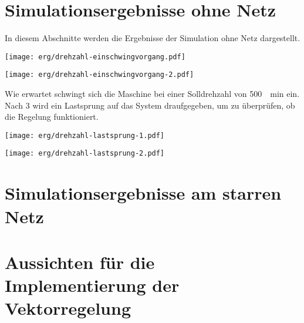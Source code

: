 \section{Simulationsergebnisse ohne Netz}\label{sec:sim-ohne-netz}

In diesem Abschnitte werden die Ergebnisse der Simulation ohne Netz dargestellt.

\begin{minipage}[t]{0.5\textwidth}
		\texttt{[image: erg/drehzahl-einschwingvorgang.pdf]}
\end{minipage}
\begin{minipage}[t]{0.5\textwidth}
		\texttt{[image: erg/drehzahl-einschwingvorgang-2.pdf]}
\end{minipage}

Wie erwartet schwingt sich die Maschine bei einer Solldrehzahl von \SI{500}{\per\minute} ein.
Nach \SI{3}{\sec} wird ein Lastsprung auf das System draufgegeben, um zu überprüfen, ob die Regelung funktioniert.

\begin{minipage}[t]{0.5\textwidth}
	\texttt{[image: erg/drehzahl-lastsprung-1.pdf]}
\end{minipage}
\begin{minipage}[t]{0.5\textwidth}
	\texttt{[image: erg/drehzahl-lastsprung-2.pdf]}
\end{minipage}

\section{Simulationsergebnisse am starren Netz}\label{sec:sim-starr-netz}


\section{Aussichten für die Implementierung der Vektorregelung}\label{sec:aussichten-foc}






